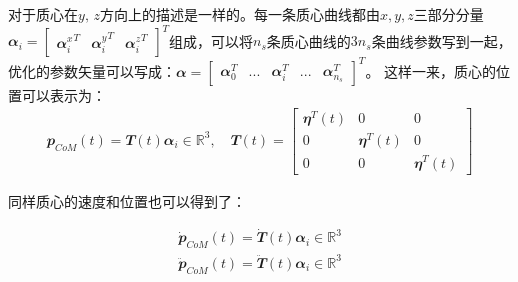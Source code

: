 对于质心在$y,\, z$方向上的描述是一样的。每一条质心曲线都由$x,y,z$三部分分量${\mathbfit \alpha}_i = \begin{bmatrix}{{\mathbfit \alpha}_i^x}^T & {{\mathbfit \alpha}_i^y}^T & {{\mathbfit \alpha}_i^z}^T\end{bmatrix}^T$组成，可以将$n_s$条质心曲线的$3n_s$条曲线参数写到一起，优化的参数矢量可以写成：${\mathbfit \alpha} = \begin{bmatrix}{\mathbfit \alpha}_0^T & ...& {\mathbfit \alpha}_i^T &...& {\mathbfit \alpha}_{n_s}^T\end{bmatrix}^T$。
这样一来，质心的位置可以表示为：
\begin{align}
    {\mathbfit p}_{CoM}(t) = {\mathbfit T}(t){\mathbfit \alpha}_i \in{\mathbb R}^3
    , \quad
    {\mathbfit T}(t) = 
    \begin{bmatrix}
    {\mathbfit \eta}^T(t) & 0 & 0 \\
    0 & {\mathbfit \eta}^T(t) & 0 \\
    0 & 0 & {\mathbfit \eta}^T(t)
    \end{bmatrix}
\end{align}

同样质心的速度和位置也可以得到了：

\begin{align}
    \dot {\mathbfit p}_{CoM}(t) = \dot {\mathbfit T}(t){\mathbfit \alpha}_i \in{\mathbb R}^3 \\
    \ddot {\mathbfit p}_{CoM}(t) = \ddot {\mathbfit T}(t){\mathbfit \alpha}_i \in{\mathbb R}^3
\end{align}




